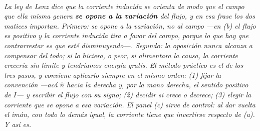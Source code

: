 \begin{center}
\begin{tikzpicture}[scale=1]
\end{tikzpicture}\\[0.5em]
{\small\itshape La ley de Lenz dice que la corriente inducida se orienta de modo
que el campo que ella misma genera \textbf{se opone a la variación} del flujo, y
en esa frase los dos matices importan. Primero: se opone a la variación, no al
campo ---en (b) el flujo es positivo y la corriente inducida tira \emph{a favor}
del campo, porque lo que hay que contrarrestar es que esté disminuyendo---.
Segundo: la oposición nunca alcanza a compensar del todo; si lo hiciera, o peor,
si alimentara la causa, la corriente crecería sin límite y tendríamos energía
gratis. El método práctico es el de los tres pasos, y conviene aplicarlo siempre
en el mismo orden: (1) fijar la convención ---acá $\hat n$ hacia la derecha y,
por la mano derecha, el sentido positivo de $I$--- y escribir el flujo con su
signo; (2) decidir si crece o decrece; (3) elegir la corriente que se opone a
\emph{esa variación}. El panel (c) sirve de control: al dar vuelta el imán, con
todo lo demás igual, la corriente tiene que invertirse respecto de (a). Y así
es.}
\end{center}
